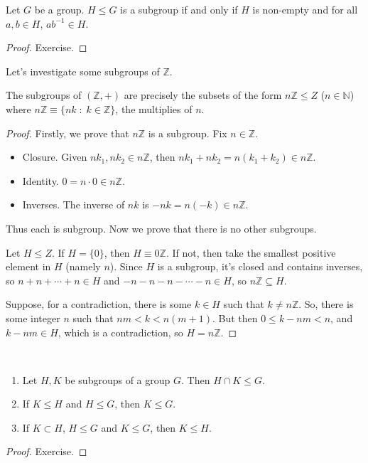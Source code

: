 \documentclass[a4]{scrartcl}
\begin{document}
\begin{lemma}
	Let $G$ be a group. $H \leq G$ is a subgroup if and only if $H$ is non-empty and for all $a, b \in H$, $ab^{-1} \in H$.
\end{lemma}
\begin{proof}
	Exercise.
\end{proof}

Let's investigate some subgroups of $\mathbb{Z}$.

\begin{proposition}
	The subgroups of $(\mathbb{Z}, +)$ are precisely the subsets of the form
	$n \mathbb{Z} \leq Z$ ($n \in \mathbb{N}$) where $n \mathbb{Z} \equiv \{nk \; : \; k \in \mathbb{Z}\}$, the multiplies of $n$.
\end{proposition}
\begin{proof}
	Firstly, we prove that $n \mathbb{Z}$ is a subgroup. Fix $n \in \mathbb{Z}$.
	\begin{itemize}
		\item Closure. Given $nk_1, nk_2 \in n\mathbb{Z}$, then $nk_1 + nk_2 = n(k_1 + k_2) \in n\mathbb{Z}$.
		\item Identity. $0 = n \cdot 0 \in n \mathbb{Z}$.
		\item Inverses. The inverse of $nk$ is $-nk = n(-k) \in n \mathbb{Z}$. 
	\end{itemize}
	Thus each is subgroup. Now we prove that there is no other subgroups.

	Let $H \leq Z$. If $H = \{ 0\}$, then $H \equiv 0\mathbb{Z}$. If not, then take the smallest positive element in $H$ (namely $n$). Since $H$ is a subgroup, it's closed and contains inverses, so
	$
	n + n + \cdots + n \in H
	$ and $-n -n -n - \cdots -n \in H$, so $n \mathbb{Z} \subseteq H$.

	Suppose, for a contradiction, there is some $k \in H$ such that $k \neq n \mathbb{Z}$.
	So, there is some integer $n$ such that $nm < k < n(m + 1)$. But then $0 \leq k - nm < n$, and $k - nm \in H$, which is a contradiction, so $H = n \mathbb{Z}$.
\end{proof}

\begin{proposition}~
	    \vspace*{-\baselineskip}
	\begin{enumerate}[label=(\roman*)]
	\item Let $H, K$ be subgroups of a group $G$. Then $H \cap K \leq G$.
	\item If $K \leq H$ and $H \leq G$, then $K \leq G$.
	\item If $K \subset H$, $H \leq G$ and $K \leq G$, then $K \leq H$.
	\end{enumerate}
\end{proposition}
\begin{proof}
	Exercise.
\end{proof}
\end{document}
